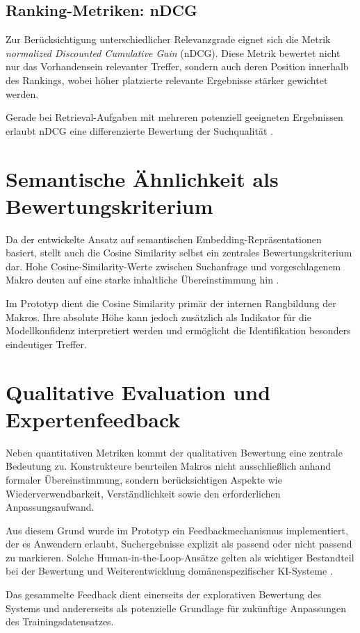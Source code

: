 \subsection{Ranking-Metriken: nDCG}

Zur Berücksichtigung unterschiedlicher Relevanzgrade eignet sich die Metrik \emph{normalized Discounted Cumulative Gain} (nDCG). Diese Metrik bewertet nicht nur das Vorhandensein relevanter Treffer, sondern auch deren Position innerhalb des Rankings, wobei höher platzierte relevante Ergebnisse stärker gewichtet werden.

Gerade bei Retrieval-Aufgaben mit mehreren potenziell geeigneten Ergebnissen erlaubt nDCG eine differenzierte Bewertung der Suchqualität \cite{lp_llm_2026}.

\section{Semantische Ähnlichkeit als Bewertungskriterium}

Da der entwickelte Ansatz auf semantischen Embedding-Repräsentationen basiert, stellt auch die Cosine Similarity selbst ein zentrales Bewertungskriterium dar. Hohe Cosine-Similarity-Werte zwischen Suchanfrage und vorgeschlagenem Makro deuten auf eine starke inhaltliche Übereinstimmung hin \cite{mishra_similarity_2020}.

Im Prototyp dient die Cosine Similarity primär der internen Rangbildung der Makros. Ihre absolute Höhe kann jedoch zusätzlich als Indikator für die Modellkonfidenz interpretiert werden und ermöglicht die Identifikation besonders eindeutiger Treffer.

\section{Qualitative Evaluation und Expertenfeedback}

Neben quantitativen Metriken kommt der qualitativen Bewertung eine zentrale Bedeutung zu. Konstrukteure beurteilen Makros nicht ausschließlich anhand formaler Übereinstimmung, sondern berücksichtigen Aspekte wie Wiederverwendbarkeit, Verständlichkeit sowie den erforderlichen Anpassungsaufwand.

Aus diesem Grund wurde im Prototyp ein Feedbackmechanismus implementiert, der es Anwendern erlaubt, Suchergebnisse explizit als passend oder nicht passend zu markieren. Solche Human-in-the-Loop-Ansätze gelten als wichtiger Bestandteil bei der Bewertung und Weiterentwicklung domänenspezifischer KI-Systeme \cite{stavarache_enhancing_2025}.

Das gesammelte Feedback dient einerseits der explorativen Bewertung des Systems und andererseits als potenzielle Grundlage für zukünftige Anpassungen des Trainingsdatensatzes.

